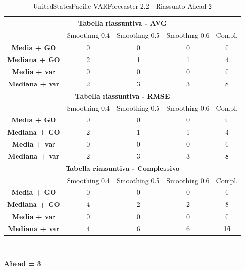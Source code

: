 \documentclass[12pt,a4paper,oneside,openright]{book}
\begin{document}
\medskip

\begin{table}[H]
\centering
\begin{tabular}{|c|c|c|c|c|}
\hline
\multicolumn{5}{|c|}{\textbf{Tabella riassuntiva - AVG}} \\
\hline
& Smoothing 0.4 & Smoothing 0.5 & Smoothing 0.6 & Compl.\\
\hline
\textbf{Media + GO} & 0 & 0 & 0 & 0\\ 
\hline
\textbf{Mediana + GO} & 2 & 1 & 1 & 4\\ 
\hline
\textbf{Media + var} & 0 & 0 & 0 & 0\\ 
\hline
\textbf{Mediana + var} & 2 & 3 & 3 & \textbf{8}\\ 
\hline
\multicolumn{5}{|c|}{\textbf{Tabella riassuntiva - RMSE}} \\
\hline
& Smoothing 0.4 & Smoothing 0.5 & Smoothing 0.6 & Compl.\\
\hline
\textbf{Media + GO} & 0 & 0 & 0 & 0\\ 
\hline
\textbf{Mediana + GO} & 2 & 1 & 1 & 4\\ 
\hline
\textbf{Media + var} & 0 & 0 & 0 & 0\\ 
\hline
\textbf{Mediana + var} & 2 & 3 & 3 & \textbf{8}\\ 
\hline
\multicolumn{5}{|c|}{\textbf{Tabella riassuntiva - Complessivo}} \\
\hline
& Smoothing 0.4 & Smoothing 0.5 & Smoothing 0.6 & Compl.\\
\hline
\textbf{Media + GO} & 0 & 0 & 0 & 0\\ 
\hline
\textbf{Mediana + GO} & 4 & 2 & 2 & 8\\ 
\hline
\textbf{Media + var} & 0 & 0 & 0 & 0\\ 
\hline
\textbf{Mediana + var} & 4 & 6 & 6 & \textbf{16}\\ 
\hline
\end{tabular} \\ 
\caption{UnitedStatesPacific VARForecaster 2.2 - Riassunto Ahead 2}
\end{table}

\newpage

\textbf{Ahead = 3}

\medskip
\end{document}
